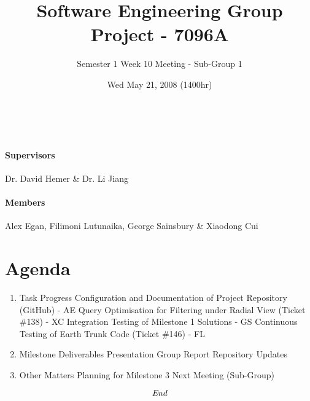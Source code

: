 \documentclass[10pt, a4]{article}
\begin{document}
\title{Software Engineering Group Project - 7096A}
\author{Semester 1 Week 10 Meeting - Sub-Group 1}
\date{Wed May 21, 2008 (1400hr)}

\maketitle
 
\\ 

\paragraph{Supervisors} Dr. David Hemer \& Dr. Li Jiang

\paragraph{Members} Alex Egan, Filimoni Lutunaika, George Sainsbury \& Xiaodong Cui

\section*{Agenda}

\begin{enumerate}
\item Task Progress
\subitem Configuration and Documentation of Project Repository (GitHub) - AE
\subitem Query Optimisation for Filtering under Radial View (Ticket \#138) - XC
\subitem Integration Testing of Milestone 1 Solutions - GS
\subitem Continuous Testing of Earth Trunk Code (Ticket \#146) - FL

\item Milestone Deliverables
\subitem Presentation
\subitem Group Report
\subitem Repository Updates


\item Other Matters
\subitem Planning for Milestone 3
\subitem Next Meeting (Sub-Group)

\end{enumerate}

\[\emph{End}\]
\end{document}
